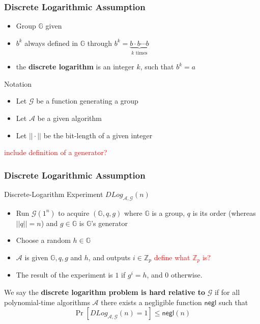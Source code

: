 \begin{frame}
	\frametitle{Discrete Logarithmic Assumption}

	\begin{definition}
		\begin{itemize}
			\item Group $\mathbb{G}$ given
			\item $b^k$ always defined in $\mathbb{G}$ through $b^k = \underbrace{b\cdot b \cdots b}_{k\text{ times}}$
			\item the \textbf{discrete logarithm} is an integer $k$, such that $b^k = a$
		\end{itemize}
	\end{definition}
	\begin{block}{Notation}
		\begin{itemize}
			\item Let $\mathcal{G}$ be a function generating a group
			\item Let $\mathcal{A}$ be a given algorithm
			\item Let $||\cdot||$ be the bit-length of a given integer
		\end{itemize}
	\end{block}
	\textcolor{red}{include definition of a generator?}
\end{frame}

\begin{frame}
	\frametitle{Discrete Logarithmic Assumption}
	\begin{block}{Discrete-Logarithm Experiment $DLog_{\mathcal{A}, \mathcal{G}}(n)$} %
		\begin{itemize}
			\item Run $\mathcal{G}(1^n)$ to acquire $(\mathbb{G}, q, g)$ where $\mathbb{G}$ is a group, $q$ is its order (whereas $||q|| = n$) and $g\in \mathbb{G}$ is $\mathbb{G}$'s generator
			\item Choose a random $h\in\mathbb{G}$
			\item $\mathcal{A}$ is given $\mathbb{G}, q, g$ and $h$, and outputs $i\in \mathbb{Z}_p$ \textcolor{red}{define what $\mathbb{Z}_p$ is?}
			\item The result of the experiment is $1$ if $g^i = h$, and $0$ otherwise.
		\end{itemize}
	\end{block}
	\begin{definition}
		We say the \textbf{discrete logarithm problem is hard relative to} $\mathcal{G}$ if for all polynomial-time algorithms $\mathcal{A}$ there exists a negligible function $\textsf{negl}$ such that 
			$$\Pr[DLog_{\mathcal{A}, \mathcal{G}}(n) = 1] \leq \textsf{negl}(n)$$
	\end{definition}
\end{frame}